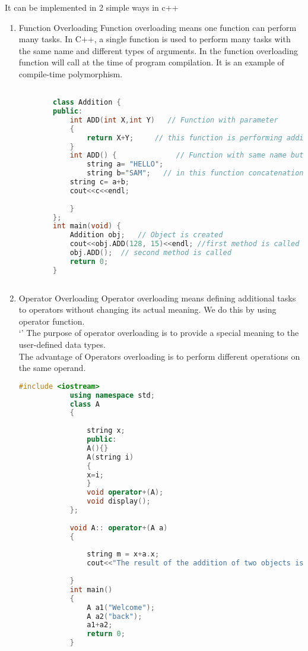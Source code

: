 \documentclass[11pt]{article}
\begin{document}
It can be implemented in 2 simple ways in c++
\begin{enumerate}
	\item Function Overloading
	      Function overloading means one function can perform many tasks. In C++, a single function is used to perform many tasks with the same name and different types of arguments. In the function overloading function will call at the time of program compilation. It is an example of compile-time polymorphism.
	      \begin{lstlisting}[language=C++]

		class Addition {
		public:
			int ADD(int X,int Y)   // Function with parameter 
			{
				return X+Y;     // this function is performing addition of  two Integer value
			}
			int ADD() {              // Function with same name but without parameter
				string a= "HELLO";
				string b="SAM";   // in this function concatenation is performed
			string c= a+b;
			cout<<c<<endl;
				
			}
		};
		int main(void) {
			Addition obj;   // Object is created  
			cout<<obj.ADD(128, 15)<<endl; //first method is called
			obj.ADD();  // second method is called
			return 0;
		}
		
	\end{lstlisting}
	\item Operator Overloading
	      Operator overloading means defining additional tasks to operators without changing its actual meaning. We do this by using operator function.\\`'
	      The purpose of operator overloading is to provide a special meaning to the user-defined data types.\\
	      The advantage of Operators overloading is to perform different operations on the same operand.


	      \begin{lstlisting}[language=C++]
			#include <iostream>  
			using namespace std;  
			class A  
			{  
				
				string x;  
				public:  
				A(){}  
				A(string i)  
				{  
				x=i;  
				}  
				void operator+(A);  
				void display();  
			};  
			
			void A:: operator+(A a)  
			{  
				
				string m = x+a.x;  
				cout<<"The result of the addition of two objects is : "<<m;  
			
			}  
			int main()  
			{  
				A a1("Welcome");  
				A a2("back");  
				a1+a2;  
				return 0;  
			}
			
	\end{lstlisting}
\end{enumerate}
\end{document}
